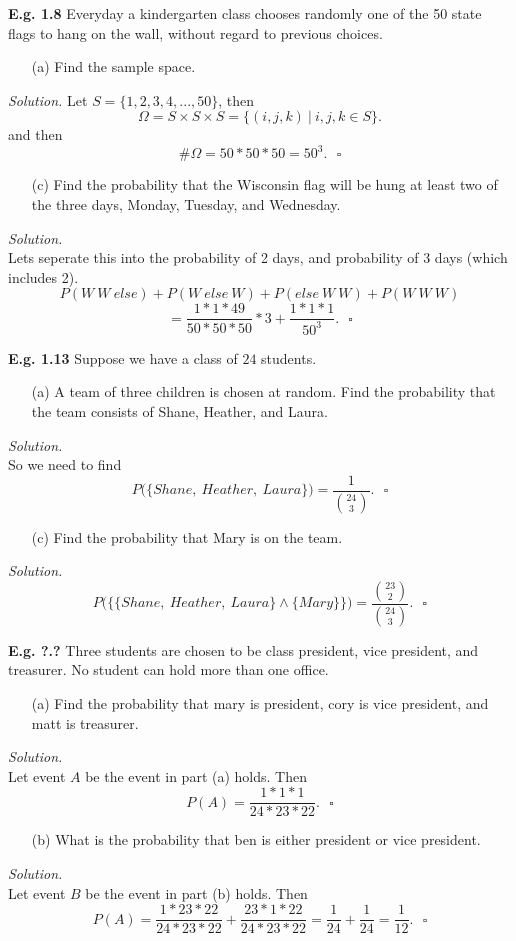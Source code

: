 \documentclass[12pt]{book}
\begin{document}
\noindent \textbf{E.g. 1.8} Everyday a kindergarten class chooses randomly one of the 50 state flags to hang on the wall, without regard to previous choices.
\begin{itemize}\item [(a)] Find the sample space.\end{itemize}
\textit{Solution.} Let $S=\{1,2,3,4,...,50\}$, then 
$$\Omega=S\times S\times S = \big\{(i,j,k) ~\big|~ i,j,k\in S \big\}.$$
and then $$\#\Omega = 50*50*50 = 50^3.~~~\square$$
\begin{itemize}\item [(c)] Find the probability that the Wisconsin flag will be hung at least two of the three days, Monday, Tuesday, and Wednesday.\end{itemize}
\textit{Solution.}\\
Lets seperate this into the probability of 2 days, and probability of 3 days (which includes 2).\\
$$P(W~W~else)+P(W~else~W)+P(else~W~W)+P(W~W~W) $$
$$= \frac{1*1*49}{50*50*50}*3+\frac{1*1*1}{50^3}.~~~\square$$


\noindent \textbf{E.g. 1.13} Suppose we have a class of $24$ students.
\begin{itemize}\item [(a)] A team of three children is chosen at random. Find the probability that the team consists of Shane, Heather, and Laura.\end{itemize}
\textit{Solution.} \\
So we need to find 
$$P\big(\{Shane, ~Heather, ~Laura\}\big) = \frac{1}{{24 \choose 3}}.~~~\square$$
\begin{itemize}\item [(c)] Find the probability that Mary is on the team.\end{itemize}
\textit{Solution.} 
$$P\Big(\big\{ \{Shane, ~Heather, ~Laura\} \land \{Mary\} \big\}\Big) = \frac{{23\choose 2}}{{24\choose 3}}.~~~\square$$

\noindent \textbf{E.g. ?.?} Three students are chosen to be class president, vice president, and treasurer. No student can hold more than one office. \\
\begin{itemize}\item [(a)] Find the probability that mary is president, cory is vice president, and matt is treasurer.\end{itemize}
\textit{Solution.}\\
Let event $A$ be the event in part (a) holds. Then 
$$P(A) = \frac{1*1*1}{24*23*22}.~~~\square$$
\begin{itemize}\item [(b)] What is the probability that ben is either president or vice president.\end{itemize}
\textit{Solution.}\\
Let event $B$ be the event in part (b) holds. Then 
$$P(A) = \frac{1*23*22}{24*23*22} + \frac{23*1*22}{24*23*22} = \frac{1}{24}+\frac{1}{24} = \frac{1}{12}.~~~\square$$
\end{document}
